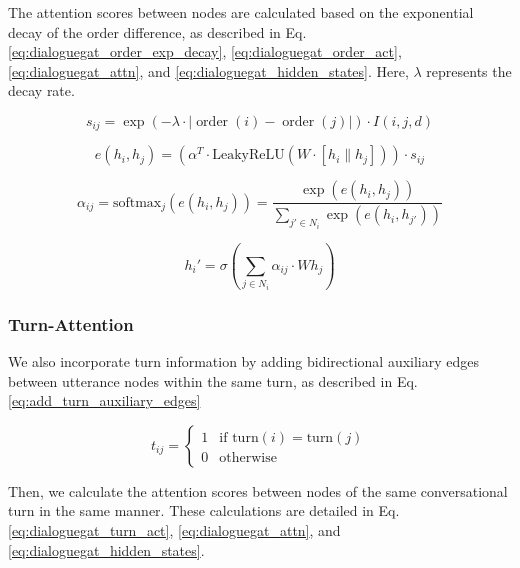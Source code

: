 The attention scores between nodes are calculated based on the exponential decay of the order difference, as described in Eq. \ref{eq:dialoguegat_order_exp_decay}, \ref{eq:dialoguegat_order_act}, \ref{eq:dialoguegat_attn}, and \ref{eq:dialoguegat_hidden_states}. Here, $\lambda$ represents the decay rate.

\begin{equation}\label{eq:dialoguegat_order_exp_decay}
    s_{ij} = \exp(-\lambda \cdot |\operatorname{order}(i) - \operatorname{order}(j)|) \cdot I(i, j, d)
\end{equation}

\begin{equation}\label{eq:dialoguegat_order_act}
    e(h_i, h_j) = (\alpha^T \cdot \text{LeakyReLU}(W \cdot [h_i \parallel h_j])) \cdot s_{ij}
\end{equation}

\begin{equation}\label{eq:dialoguegat_attn}
    \alpha_{ij} = \text{softmax}_j \left( e(h_i, h_j) \right) = \frac{\exp(e(h_i, h_j))}
    {\sum_{j' \in N_i} \exp(e(h_i, h_{j'}))}
\end{equation}

\begin{equation}\label{eq:dialoguegat_hidden_states}
    h_i' = \sigma \left( \sum_{j \in N_i} \alpha_{ij} \cdot W h_j \right)
\end{equation}

\subsubsection{Turn-Attention}
We also incorporate turn information by adding bidirectional auxiliary edges between utterance nodes within the same turn, as described in Eq. \ref{eq:add_turn_auxiliary_edges}

\begin{equation}\label{eq:add_turn_auxiliary_edges}
    t_{ij} = 
    \begin{cases} 
    1 & \text{if } \text{turn}(i) = \text{turn}(j) \\
    0 & \text{otherwise}
    \end{cases}
\end{equation}

Then, we calculate the attention scores between nodes of the same conversational turn in the same manner. These calculations are detailed in Eq. \ref{eq:dialoguegat_turn_act}, \ref{eq:dialoguegat_attn}, and \ref{eq:dialoguegat_hidden_states}.

